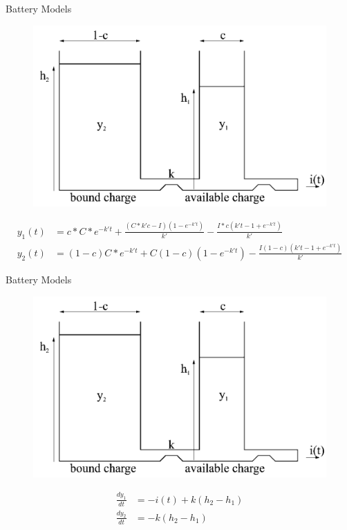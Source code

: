\begin{frame}[fragile]{Battery Models}{\insertsubsection}
	\centering
	\begin{figure}[h]
		\includegraphics[width=.7\textwidth]{graphics/kibam_wells}
	\end{figure}
	\begin{equation*}
	\begin{aligned}
		y_1(t) &= c*C*e^{-k't}+\frac{(C*k'c-I)(1-e^{-k't})}{k'}-\frac{I*c(k't-1+e^{-k't})}{k'}\\
		y_2(t) &= (1-c)C*e^{-k't}+C(1-c)(1-e^{-k't})-\frac{I(1-c)(k't-1+e^{-k't})}{k'}
	\end{aligned}
	\end{equation*}
\end{frame}
\begin{frame}[fragile]{Battery Models}{\insertsubsection}
	\centering
	\begin{figure}[h]
		\includegraphics[width=.7\textwidth]{graphics/kibam_wells}
	\end{figure}
	\begin{equation*}
	\begin{aligned}
		\frac{dy_1}{dt} &= -i(t)+k(h_2-h_1)\\
		\frac{dy_2}{dt} &= -k(h_2-h_1)
	\end{aligned}
	\end{equation*}
\end{frame}

